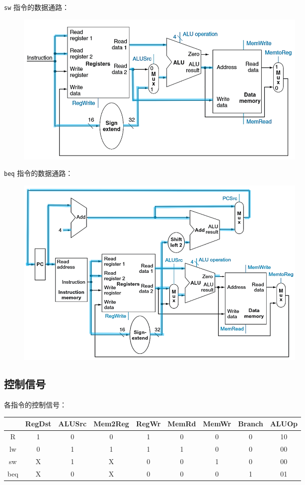 \documentclass[cn, hazy, blue, normal, 12pt]{elegantnote}
\begin{document}
\lstinline{sw} 指令的数据通路：

\begin{figure}[h]
    \centering
    \includegraphics[width=0.7\textwidth]{./images/DATAPATH_SW.png}
\end{figure}

\lstinline{beq} 指令的数据通路：

\begin{figure}[h]
    \centering
    \includegraphics[width=0.7\textwidth]{./images/DATAPATH_BEQ.png}
\end{figure}

\subsection{控制信号}

各指令的控制信号：

\begin{table}[h]
    \centering
    \begin{tabular}{ccccccccc}
        \hline
            & RegDst & ALUSrc & Mem2Reg & RegWr & MemRd & MemWr & Branch & ALUOp \\
        \hline
        R   & 1      & 0      & 0       & 1     & 0     & 0     & 0      & 10    \\
        lw  & 0      & 1      & 1       & 1     & 1     & 0     & 0      & 00    \\
        sw  & X      & 1      & X       & 0     & 0     & 1     & 0      & 00    \\
        beq & X      & 0      & X       & 0     & 0     & 0     & 1      & 01    \\
        \hline
    \end{tabular}
\end{table}
\end{document}
